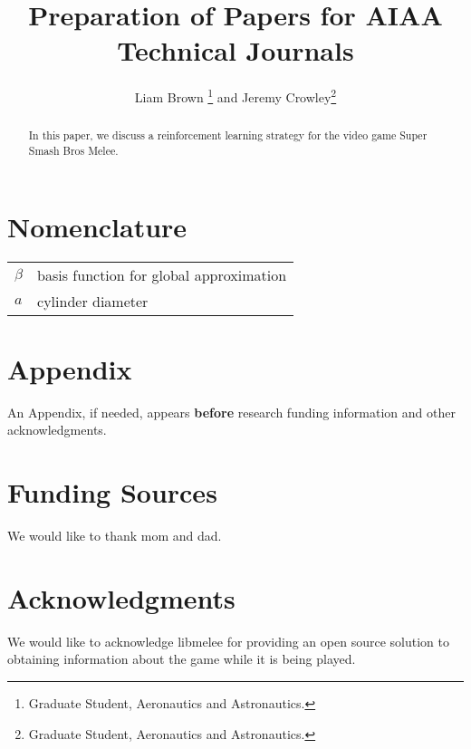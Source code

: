 \documentclass[journal]{new-aiaa}
\title{Preparation of Papers for AIAA Technical Journals}
\author{Liam Brown \footnote{Graduate Student, Aeronautics and Astronautics.} and Jeremy Crowley\footnote{Graduate Student, Aeronautics and Astronautics.}}
\affil{Stanford Universiry, Stanford, CA, 94305}
\begin{document}
\maketitle

\begin{abstract}
In this paper, we discuss a reinforcement learning strategy for the video game Super Smash Bros Melee. 
\end{abstract}

\section*{Nomenclature}

{\renewcommand\arraystretch{1.0}
\noindent\begin{longtable*}{@{}l @{\quad=\quad} l@{}}
$\beta$  & basis function for global approximation \\
$a$ &    cylinder diameter \\
\end{longtable*}}


%
%



%
%



%
%



%
%



%
%



%
%
\section*{Appendix}

An Appendix, if needed, appears \textbf{before} research funding information and other acknowledgments.


%
%
\section*{Funding Sources}

We would like to thank mom and dad.


%
%
\section*{Acknowledgments}

We would like to acknowledge libmelee for providing an open source solution to obtaining information about the game while it is being played.



\end{document}
